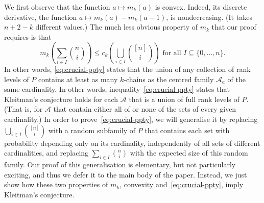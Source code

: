 \documentclass[11pt,a4paper,reqno]{amsart}
\numberwithin{claim}{thm}
\theoremstyle{definition}
\newcommand{\cA}{\mathcal{A}}
\renewcommand{\le}{\leqslant}
\begin{document}
We first observe that the function $a \mapsto m_k(a)$ is convex. Indeed, its discrete derivative, the function $a \mapsto m_k(a) - m_k(a-1)$, is nondecreasing. (It takes $n+2-k$ different values.) The much less obvious property of $m_k$ that our proof requires is that
\begin{equation}
  \label{eq:crucial-ppty}
  m_k\left( \sum_{i \in I} \binom{n}{i} \right) \le c_k\left( \bigcup_{i \in I} \binom{[n]}{i} \right) \text{ for all $I \subseteq \{0, \dotsc, n\}$}.
\end{equation}
In other words, \eqref{eq:crucial-ppty} states that the union of any collection of rank levels of $P$ contains at least as many $k$-chains as the centred family $\cA_a$ of the same cardinality. In other words, inequality~\eqref{eq:crucial-ppty} states that Kleitman's conjecture holds for each $\cA$ that is a union of full rank levels of $P$. (That is, for $\cA$ that contain either all of or none of the sets of every given cardinality.) In order to prove~\eqref{eq:crucial-ppty}, we will generalise it by replacing $\bigcup_{i \in I} \binom{[n]}{i}$ with a random subfamily of $P$ that contains each set with probability depending only on its cardinality, independently of all sets of different cardinalities, and replacing $\sum_{i \in I} \binom{n}{i}$ with the expected size of this random family. Our proof of this generalisation is elementary, but not particularly exciting, and thus we defer it to the main body of the paper. Instead, we just show how these two properties of $m_k$, convexity and~\eqref{eq:crucial-ppty}, imply Kleitman's conjecture.
\end{document}
